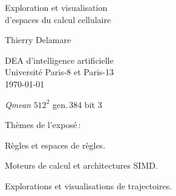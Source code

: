 \documentclass[a4paper,dvips]{slides}
\renewcommand{\arule}[1]{\emph{\mbox{#1}}} %
\renewcommand{\asquare}[1]{\ensuremath{#1^{2}}}
\newcommand{\agen}[1]{gen.\,#1}
\newcommand{\aplane}[1]{bit #1}
\begin{document}
\addtolength{\textheight}{\topmargin}
\addtolength{\textheight}{\headheight}
\addtolength{\textheight}{\headsep}
\addtolength{\textheight}{\footskip}

\setlength{\topmargin}{0pt}
\setlength{\headheight}{0pt}
\setlength{\headsep}{0pt}
\setlength{\footskip}{0pt}

\begin{center}
  \begin{Large}
    Exploration et visualisation\\
    d'espaces du calcul cellulaire
  \end{Large}
  \bigskip
  \begin{large}
    Thierry Delamare\\
  \end{large}
  \bigskip
  \bigskip
  DEA d'intelligence artificielle\\
  Universit\'e Paris-8 et Paris-13\\
  \bigskip
  \today
  \bigskip
\end{center}
\bigskip
\bigskip
\bigskip
{}%
{\arule{Qmean} \asquare{512} \agen{384} \aplane{3}}

\begin{slide}
  \begin{center}
    \begin{Large}
      Th\`emes de l'expos\'e\,:
    \end{Large}
  \end{center}
  
  R\`egles et espaces de r\`egles.
  
  Moteurs de calcul et architectures SIMD.
  
  Explorations et visualisations de trajectoires.
\end{slide}
\end{document}

